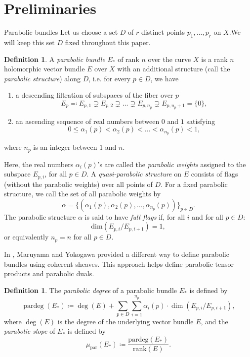 \documentclass[11pt, reqno]{amsart}
\makeatletter
\numberwithin{equation}{section}
\def\subsection{\@startsection{subsection}{2}%
  \normalparindent{.5\linespacing\@plus.7\linespacing}{-.5em}%
  {\normalfont\bfseries}}
\theoremstyle{definition}
\newtheorem{definition}[theorem]{Definition}
\makeatother
\begin{document}
\section{Preliminaries}
\subsection{Parabolic bundles}
	Let us choose a set $D$ of $r$ distinct points $p_1, ..., p_r$ on $X$.We will keep this set $D$ fixed throughout this paper.
	\begin{definition}\label{parabolic}
		 A \textit{parabolic bundle} $E_*$ of rank $n$ over the curve $X$ is a rank $n$ holomorphic vector bundle $E$ over $X$ with an additional structure (call the \textit{parabolic structure}) along $D$, i.e. for every $p\in D$, we have
	\begin{enumerate}
		\item a descending filtration of subspaces of the fiber over $p$
		\[
		E_p \eqqcolon E_{p,1}\supsetneq E_{p,2} \supsetneq \dots \supsetneq E_{p,n_p} \supsetneq E_{p,n_p+1} =\{0\},
		\]
		\item an ascending sequence of real numbers between $0$ and $1$ satisfying 
		\[
		0\leq \alpha_1(p) < \alpha_2(p) < \dots < \alpha_{n_p}(p) < 1,
		\]
	\end{enumerate}
where $n_p$ is an integer between $1$ and $n$. 
\end{definition}

Here, the real numbers $\alpha_i(p)$'s are called the \textit{parabolic weights} assigned to the subspace $E_{p, i}$, for all $p\in D$. A \textit{quasi-parabolic structure} on $E$ consists of flags (without the parabolic weights) over all points of $D$. For a fixed parabolic structure, we call the set of all parabolic weights by $$\alpha =\{(\alpha_1(p),\alpha_2(p),\dots,\alpha_{n_p}(p))\}_{p\in D}.$$ The parabolic structure $\alpha$ is said to have \textit{full flags} if, for all $i$ and for all $p \in D$:
\[
\mathrm{dim}(E_{p,i}/E_{p,i+1}) = 1,
\] 
or equivalently $n_p=n$ for all $p\in D$.

In \cite{MY92}, Maruyama and Yokogawa provided a different way to define parabolic bundles using coherent sheaves. This approach helps define parabolic tensor products and parabolic duals.

\begin{definition}
     The \textit{parabolic degree} of a parabolic bundle $E_*$ is defined by
\[
\operatorname{pardeg}(E_*) \coloneqq \deg(E)+ \sum\limits_{p\in D}\sum\limits_{i=1}^{n_p} \alpha_i(p) \cdot \dim(E_{p,i}/E_{p,i+1}),
\]
where $\deg(E)$ is the degree of the underlying vector bundle $E$, and the \textit{parabolic slope} of $E_*$ is defined by
\[
\mu_{\mathrm{par}}(E_*) \coloneqq \frac{\text{pardeg}(E_*)}{\mathrm{rank}(E)}.
\]
\end{definition}
\end{document}
